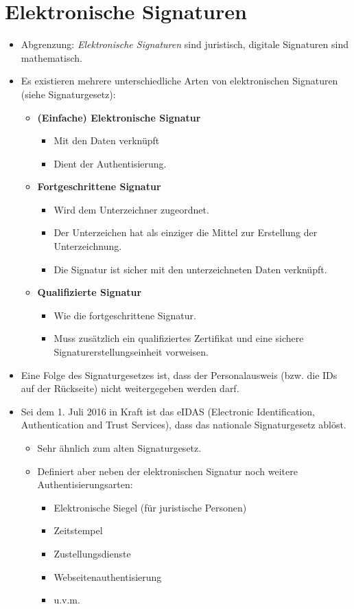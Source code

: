 	\section{Elektronische Signaturen}
		\begin{itemize}
			\item Abgrenzung: \textit{Elektronische Signaturen} sind juristisch, digitale Signaturen sind mathematisch.
			\item Es existieren mehrere unterschiedliche Arten von elektronischen Signaturen (siehe Signaturgesetz):
				\begin{itemize}
					\item \textbf{(Einfache) Elektronische Signatur}
						\begin{itemize}
							\item Mit den Daten verknüpft
							\item Dient der Authentisierung.
						\end{itemize}
					\item \textbf{Fortgeschrittene Signatur}
						\begin{itemize}
							\item Wird dem Unterzeichner zugeordnet.
							\item Der Unterzeichen hat als einziger die Mittel zur Erstellung der Unterzeichnung.
							\item Die Signatur ist sicher mit den unterzeichneten Daten verknüpft.
						\end{itemize}
					\item \textbf{Qualifizierte Signatur}
						\begin{itemize}
							\item Wie die fortgeschrittene Signatur.
							\item Muss zusätzlich ein qualifiziertes Zertifikat und eine sichere Signaturerstellungseinheit vorweisen.
						\end{itemize}
				\end{itemize}
			\item Eine Folge des Signaturgesetzes ist, dass der Personalausweis (bzw. die IDs auf der Rückseite) nicht weitergegeben werden darf.
			\item Sei dem 1. Juli 2016 in Kraft ist das eIDAS (Electronic Identification, Authentication and Trust Services), dass das nationale Signaturgesetz ablöst.
				\begin{itemize}
					\item Sehr ähnlich zum alten Signaturgesetz.
					\item Definiert aber neben der elektronischen Signatur noch weitere Authentisierungsarten:
						\begin{itemize}
							\item Elektronische Siegel (für juristische Personen)
							\item Zeitstempel
							\item Zustellungsdienste
							\item Webseitenauthentisierung
							\item u.v.m.
						\end{itemize}
				\end{itemize}
		\end{itemize}


